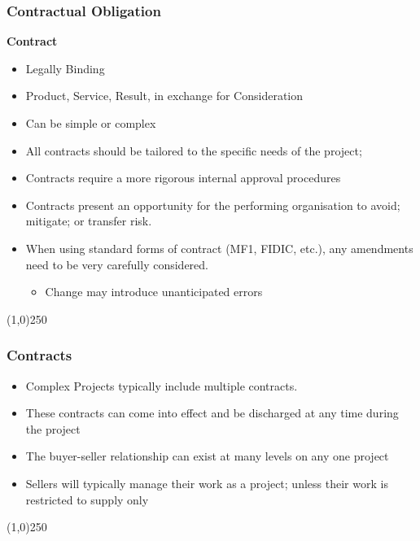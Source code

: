 \begin{frame}
\frametitle{Contractual Obligation}
\textbf{Contract}
\begin{itemize}
	\item Legally Binding
	\item Product, Service, Result, in exchange for Consideration
	\item Can be simple or complex
\end{itemize}
\begin{itemize}
	\item All contracts should be tailored to the specific needs of the project;\\
	\item Contracts require a more rigorous internal approval procedures\\
	\item Contracts present an opportunity for the performing organisation to avoid; mitigate; or transfer risk.\\
	\item When using standard forms of contract (MF1, FIDIC, etc.), any amendments need to be very carefully considered.
			\begin{itemize}
				\item Change may introduce unanticipated errors
			\end{itemize}
\end{itemize}
\end{frame}\begin{center}\line(1,0){250}\end{center}



\begin{frame}
\frametitle{Contracts}
\begin{itemize}
	\item Complex Projects typically include multiple contracts.
	\item These contracts can come into effect and be discharged at any time during the project
	\item The buyer-seller relationship can exist at many levels on any one project
	\item Sellers will typically manage their work as a project; unless their work is restricted to supply only
\end{itemize}
\end{frame}\begin{center}\line(1,0){250}\end{center}




